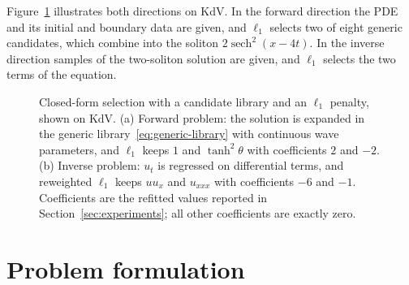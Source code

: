 \documentclass{article}
\newcommand{\sech}{\operatorname{sech}}
\begin{document}
Figure~\ref{fig:overview} illustrates both directions on KdV. In the forward direction the PDE and its initial and boundary data are given, and $\ell_1$ selects two of eight generic candidates, which combine into the soliton $2\sech^2(x-4t)$. In the inverse direction samples of the two-soliton solution are given, and $\ell_1$ selects the two terms of the equation.

\begin{figure}[t]
\centering
\resizebox{\linewidth}{!}{}
\caption{Closed-form selection with a candidate library and an $\ell_1$ penalty, shown on KdV. (a) Forward problem: the solution is expanded in the generic library~\eqref{eq:generic-library} with continuous wave parameters, and $\ell_1$ keeps $1$ and $\tanh^2\theta$ with coefficients $2$ and $-2$. (b) Inverse problem: $u_t$ is regressed on differential terms, and reweighted $\ell_1$ keeps $uu_x$ and $u_{xxx}$ with coefficients $-6$ and $-1$. Coefficients are the refitted values reported in Section~\ref{sec:experiments}; all other coefficients are exactly zero.}
\label{fig:overview}
\end{figure}

\section{Problem formulation}
\label{sec:formulation}
\end{document}
